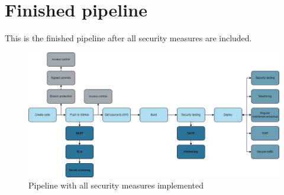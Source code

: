 \section{Finished pipeline}
This is the finished pipeline after all security measures are included.

\vspace{2mm}
\begin{figure}[H]
    \centering
    \includegraphics[width=0.8\columnwidth]{Images/pipeline9.png}
    \caption{Pipeline with all security measures implemented}
    \label{fig: Pipeline with all security measures implemented}
\end{figure}



